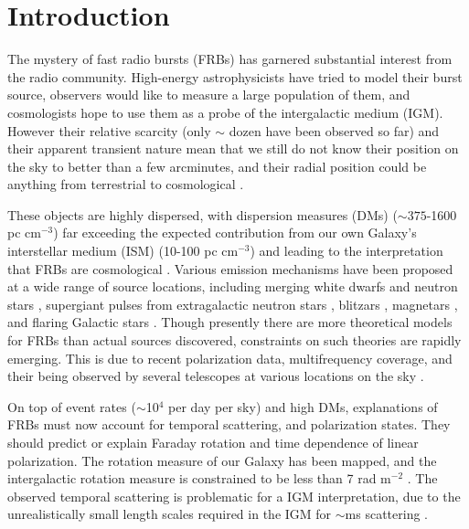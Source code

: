 \documentclass[useAMS,usenatbib]{mn2e}
\begin{document}
\newcommand{\be}{\begin{eqnarray}}
\newcommand{\ee}{\end{eqnarray}}
\newcommand{\beq}{\begin{equation}}
\newcommand{\eeq}{\end{equation}}

\section{Introduction}
The mystery of fast radio bursts (FRBs) has garnered
substantial interest from the radio community.
High-energy astrophysicists have tried to model their burst source, 
observers would like to measure a large population of them, and cosmologists
hope to use them as a probe of the intergalactic medium (IGM). However their relative scarcity 
(only $\sim$ dozen have been observed so far) and their apparent 
transient nature mean that we still do not know their position on the sky
to better than a few arcminutes, and their radial position could be anything
from terrestrial to cosmological \citep{2014ApJ...797...70K}.

These objects are
highly dispersed, with dispersion measures (DMs) ($\sim 375$-1600 pc cm$^{-3}$) far exceeding
the expected contribution from our own Galaxy's interstellar medium (ISM) (10-100 pc cm$^{-3}$) and leading to the
interpretation that FRBs are cosmological \citep{2007Sci...318..777L, 2013Sci...341...53T}. 
Various emission mechanisms have been proposed 
at a wide range of source locations, 
including merging white dwarfs \citep{2013ApJ...776L..39K}
and neutron stars \citep{2013PASJ...65L..12T}, supergiant pulses 
from extragalactic neutron stars \citep{2015arXiv150100753C},
blitzars \citep{2014A&A...562A.137F}, 
magnetars \citep{2007arXiv0710.2006P, 2014MNRAS.442L...9L, 2015arXiv150101341P}, 
and flaring Galactic stars \citep{2014MNRAS.439L..46L}. 
Though presently there are more theoretical models for FRBs than actual 
sources discovered, constraints on such theories are rapidly emerging. 
This is due to recent polarization data, 
multifrequency coverage, and their being observed by several telescopes
at various locations on the sky \citep{2014ApJ...780L...2B, 2014arXiv1412.0342P}. 

On top of event rates ($\sim$10$^4$ per day per sky) 
and high DMs, explanations of FRBs must now
account for temporal scattering, and polarization states.  They should
predict or explain Faraday rotation and time dependence of linear polarization.
The rotation measure of our Galaxy has been mapped, and the
intergalactic rotation measure is constrained to be less than 7 rad m$^{-2}$
\citep{2015A&A...575A.118O}. 
The observed temporal scattering is problematic for a IGM interpretation, due 
to the unrealistically small length scales required in the IGM 
for $\sim$ms scattering \citep{2014ApJ...785L..26L}. 
\end{document}
